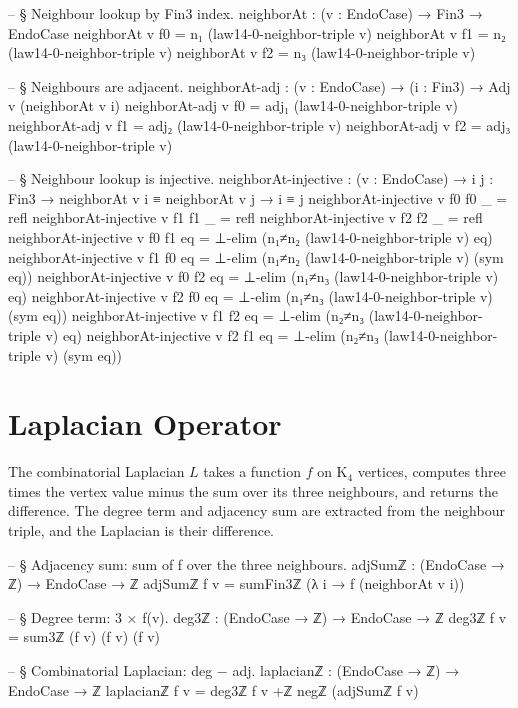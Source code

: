 \documentclass[11pt,a4paper]{book}
\begin{document}
\begin{code}
-- § Neighbour lookup by Fin3 index.
neighborAt : (v : EndoCase) → Fin3 → EndoCase
neighborAt v f0 = n₁ (law14-0-neighbor-triple v)
neighborAt v f1 = n₂ (law14-0-neighbor-triple v)
neighborAt v f2 = n₃ (law14-0-neighbor-triple v)

-- § Neighbours are adjacent.
neighborAt-adj : (v : EndoCase) → (i : Fin3) → Adj v (neighborAt v i)
neighborAt-adj v f0 = adj₁ (law14-0-neighbor-triple v)
neighborAt-adj v f1 = adj₂ (law14-0-neighbor-triple v)
neighborAt-adj v f2 = adj₃ (law14-0-neighbor-triple v)

-- § Neighbour lookup is injective.
neighborAt-injective : (v : EndoCase) → {i j : Fin3} → neighborAt v i ≡ neighborAt v j → i ≡ j
neighborAt-injective v {f0} {f0} _ = refl
neighborAt-injective v {f1} {f1} _ = refl
neighborAt-injective v {f2} {f2} _ = refl
neighborAt-injective v {f0} {f1} eq = ⊥-elim (n₁≠n₂ (law14-0-neighbor-triple v) eq)
neighborAt-injective v {f1} {f0} eq = ⊥-elim (n₁≠n₂ (law14-0-neighbor-triple v) (sym eq))
neighborAt-injective v {f0} {f2} eq = ⊥-elim (n₁≠n₃ (law14-0-neighbor-triple v) eq)
neighborAt-injective v {f2} {f0} eq = ⊥-elim (n₁≠n₃ (law14-0-neighbor-triple v) (sym eq))
neighborAt-injective v {f1} {f2} eq = ⊥-elim (n₂≠n₃ (law14-0-neighbor-triple v) eq)
neighborAt-injective v {f2} {f1} eq = ⊥-elim (n₂≠n₃ (law14-0-neighbor-triple v) (sym eq))
\end{code}

\section{Laplacian Operator}

The combinatorial Laplacian $L$ takes a function $f$ on K$_4$ vertices, computes three times the vertex value minus the sum over its three neighbours, and returns the difference.
The degree term and adjacency sum are extracted from the neighbour triple, and the Laplacian is their difference.

\begin{code}
-- § Adjacency sum: sum of f over the three neighbours.
adjSumℤ : (EndoCase → ℤ) → EndoCase → ℤ
adjSumℤ f v = sumFin3ℤ (λ i → f (neighborAt v i))

-- § Degree term: 3 × f(v).
deg3ℤ : (EndoCase → ℤ) → EndoCase → ℤ
deg3ℤ f v = sum3ℤ (f v) (f v) (f v)

-- § Combinatorial Laplacian: deg − adj.
laplacianℤ : (EndoCase → ℤ) → EndoCase → ℤ
laplacianℤ f v = deg3ℤ f v +ℤ negℤ (adjSumℤ f v)
\end{code}
\end{document}
